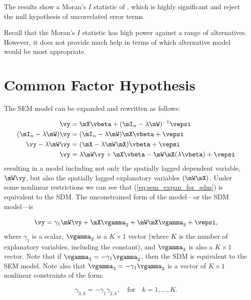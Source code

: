 \documentclass[english,12pt]{book}\usepackage[]{graphicx}\usepackage[]{xcolor}
\begin{document}
The results show a Moran's $I$ statistic of  , which is highly significant and reject the null hypothesis of uncorrelated error terms. 

Recall that the Moran's $I$ statistic has high power against a range of alternatives. However, it does not provide much help in terms of which alternative model would be most appropriate.

\section{Common Factor Hypothesis}

The SEM model can be expanded and rewritten as follows:

\begin{equation}\label{eq:sem_expan_for_sdm}
  \begin{aligned}
    \vy & = \mX\vbeta + (\mI_n - \lambda\mW)^{-1}\vepsi \\
    (\mI_n - \lambda\mW)\vy &= (\mI_n - \lambda\mW)\mX\vbeta + \vepsi \\
    \vy - \lambda\mW\vy &= (\mX - \lambda\mW\mX)\vbeta + \vepsi \\
    \vy &= \lambda\mW\vy + \mX\vbeta - \mW\mX(\lambda\vbeta) + \vepsi
  \end{aligned}
\end{equation}
%
resulting in a model including not only the spatially lagged dependent variable, $\mW\vy$, but also the spatially lagged explanatory variables $(\mW\mX)$. Under some nonlinear restrictions we can see that (\ref{eq:sem_expan_for_sdm}) is equivalent to the SDM. The unconstrained form of the model---or the SDM model---is

\begin{equation}\label{eq:sem_restricted}
  \vy  = \gamma_1\mW\vy + \mX\vgamma_2 + \mW\mX\vgamma_3 + \vepsi,
\end{equation}
%
where $\gamma_1$ is a scalar, $\vgamma_2$ is a $K\times 1$ vector (where $K$ is the number of explanatory variables, including the constant), and $\vgamma_3$ is also a $K\times 1$ vector. Note that  if $\vgamma_3 = -\gamma_1\vgamma_2$, then the SDM is equivalent to the SEM model. Note also that $\vgamma_3 = -\gamma_1\vgamma_2$ is a vector of $K\times 1$ nonlinear constraints of the form:

\begin{equation}
  \gamma_{3, k} = -\gamma_1\gamma_{2,k}, \quad \mbox{for}\quad k = 1,...,K.
\end{equation}
\end{document}
